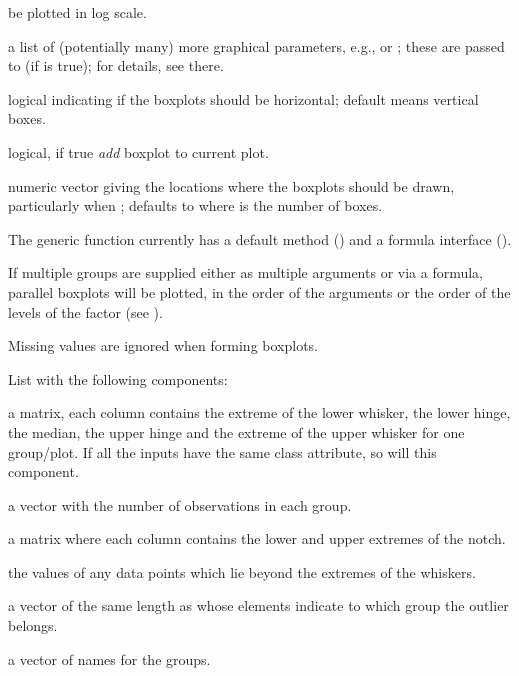 \begin{Arguments}
\begin{ldescription}
be plotted in log scale.
\item[\code{pars}] a list of (potentially many) more graphical parameters,
e.g.,  or ; these are passed to
 (if  is true); for details, see there.
\item[\code{horizontal}] logical indicating if the boxplots should be
horizontal; default  means vertical boxes.
\item[\code{add}] logical, if true \emph{add} boxplot to current plot.
\item[\code{at}] numeric vector giving the locations where the boxplots should
be drawn, particularly when ;
defaults to  where  is the number of boxes.
\end{ldescription}
\end{Arguments}
%
\begin{Details}\relax
The generic function  currently has a default method
() and a formula interface ().

If multiple groups are supplied either as multiple arguments or via a
formula, parallel boxplots will be plotted, in the order of the
arguments or the order of the levels of the factor (see
).

Missing values are ignored when forming boxplots.
\end{Details}
%
\begin{Value}
List with the following components:
\begin{ldescription}
\item[\code{stats}] a matrix, each column contains the extreme of the lower
whisker, the lower hinge, the median, the upper hinge and the
extreme of the upper whisker for one group/plot.  If all the inputs
have the same class attribute, so will this component.
\item[\code{n}] a vector with the number of observations in each group.
\item[\code{conf}] a matrix where each column contains the lower and upper
extremes of the notch.
\item[\code{out}] the values of any data points which lie beyond the
extremes of the whiskers.
\item[\code{group}] a vector of the same length as  whose elements
indicate to which group the outlier belongs.
\item[\code{names}] a vector of names for the groups.
\end{ldescription}
\end{Value}
